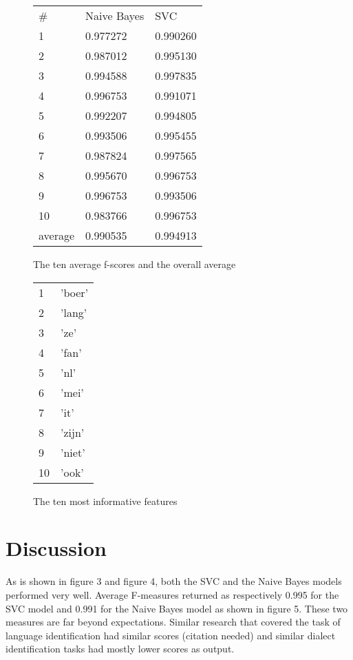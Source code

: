 \documentclass[
10pt, %
a4paper, %
oneside, %
headinclude,footinclude, %
] {book}%
\begin{document}
\begin{figure}[h]
\begin{tabular}{lll }
	\# & Naive Bayes & SVC \\
	1 & 0.977272 & 0.990260 \\
	2 & 0.987012 & 0.995130 \\
	3 & 0.994588 & 0.997835 \\
	4 & 0.996753 & 0.991071 \\
	5 & 0.992207 & 0.994805 \\
	6 & 0.993506 & 0.995455 \\
	7 & 0.987824 & 0.997565 \\
	8 & 0.995670 & 0.996753 \\
	9 & 0.996753 & 0.993506 \\
	10 & 0.983766 & 0.996753 \\
	\hline
	average & 0.990535 & 0.994913

\end{tabular}
\caption{The ten average f-scores and the overall average}
\end{figure}

\begin{figure}[h]
\begin{tabular}{ll}
	1 & 'boer' \\
	2 & 'lang' \\
	3 & 'ze' \\
	4 & 'fan' \\
	5 & 'nl' \\
	6 & 'mei' \\
	7 & 'it' \\
	8 & 'zijn' \\
	9 & 'niet' \\
	10 & 'ook' 
\end{tabular}
\caption{The ten most informative features}
\end{figure}

\section{Discussion}
As is shown in figure 3 and figure 4, both the SVC and the Naive Bayes models performed very well. Average F-measures returned as respectively 0.995 for the SVC model and 0.991 for the Naive Bayes model as shown in figure 5. These two measures are far beyond expectations. Similar research that covered the task of language identification had similar scores (citation needed) and similar dialect identification tasks had mostly lower scores as output. \\
\end{document}
